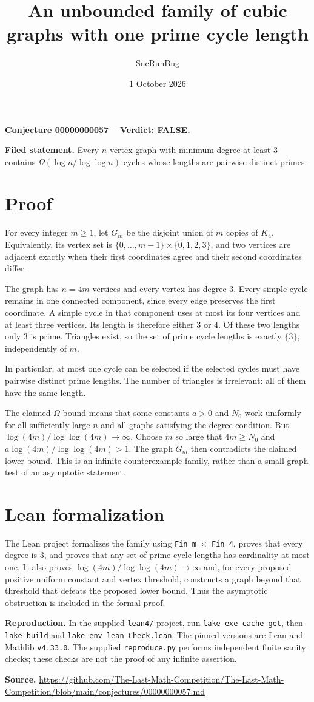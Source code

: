 \documentclass[11pt]{article}
\title{An unbounded family of cubic graphs with one prime cycle length}
\author{SucRunBug}
\date{1 October 2026}
\begin{document}
\maketitle
\textbf{Conjecture 00000000057 -- Verdict: FALSE.}

\textbf{Filed statement.} Every $n$-vertex graph with minimum degree at least $3$ contains $\Omega(\log n/\log\log n)$ cycles whose lengths are pairwise distinct primes.

\section*{Proof}
For every integer $m\ge1$, let $G_m$ be the disjoint union of $m$ copies of $K_4$. Equivalently, its vertex set is $\{0,\ldots,m-1\}\times\{0,1,2,3\}$, and two vertices are adjacent exactly when their first coordinates agree and their second coordinates differ.

The graph has $n=4m$ vertices and every vertex has degree $3$. Every simple cycle remains in one connected component, since every edge preserves the first coordinate. A simple cycle in that component uses at most its four vertices and at least three vertices. Its length is therefore either $3$ or $4$. Of these two lengths only $3$ is prime. Triangles exist, so the set of prime cycle lengths is exactly $\{3\}$, independently of $m$.

In particular, at most one cycle can be selected if the selected cycles must have pairwise distinct prime lengths. The number of triangles is irrelevant: all of them have the same length.

The claimed $\Omega$ bound means that some constants $a>0$ and $N_0$ work uniformly for all sufficiently large $n$ and all graphs satisfying the degree condition. But $\log(4m)/\log\log(4m)\to\infty$. Choose $m$ so large that $4m\ge N_0$ and $a\log(4m)/\log\log(4m)>1$. The graph $G_m$ then contradicts the claimed lower bound. This is an infinite counterexample family, rather than a small-graph test of an asymptotic statement.

\section*{Lean formalization}
The Lean project formalizes the family using \texttt{Fin m $\times$ Fin 4}, proves that every degree is $3$, and proves that any set of prime cycle lengths has cardinality at most one. It also proves $\log(4m)/\log\log(4m)\to\infty$ and, for every proposed positive uniform constant and vertex threshold, constructs a graph beyond that threshold that defeats the proposed lower bound. Thus the asymptotic obstruction is included in the formal proof.

\textbf{Reproduction.} In the supplied \texttt{lean4/} project, run
\texttt{lake exe cache get}, then \texttt{lake build} and
\texttt{lake env lean Check.lean}. The pinned versions are Lean and Mathlib
\texttt{v4.33.0}. The supplied \texttt{reproduce.py} performs independent
finite sanity checks; these checks are not the proof of any infinite assertion.

\textbf{Source.} \url{https://github.com/The-Last-Math-Competition/The-Last-Math-Competition/blob/main/conjectures/00000000057.md}
\end{document}
